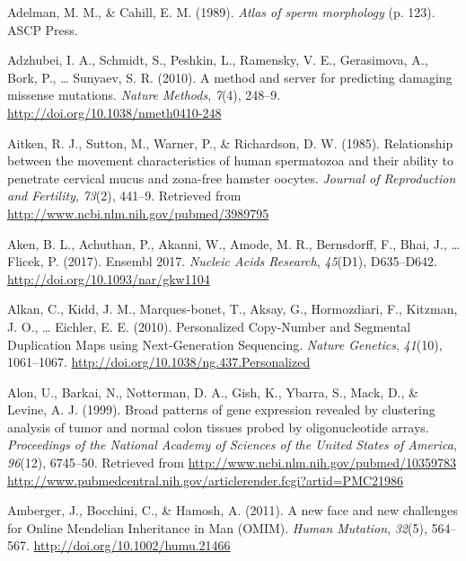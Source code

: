 \documentclass[12pt,twoside]{reedthesis}
\theoremstyle{definition}
\theoremstyle{definition}
\theoremstyle{remark}
\begin{document}
  \hypertarget{ref-Adelman1989}{}
  Adelman, M. M., \& Cahill, E. M. (1989). \emph{Atlas of sperm
  morphology} (p. 123). ASCP Press.
  
  \hypertarget{ref-Adzhubei2010}{}
  Adzhubei, I. A., Schmidt, S., Peshkin, L., Ramensky, V. E., Gerasimova,
  A., Bork, P., \ldots{} Sunyaev, S. R. (2010). A method and server for
  predicting damaging missense mutations. \emph{Nature Methods},
  \emph{7}(4), 248--9. \url{http://doi.org/10.1038/nmeth0410-248}
  
  \hypertarget{ref-Aitken1985}{}
  Aitken, R. J., Sutton, M., Warner, P., \& Richardson, D. W. (1985).
  Relationship between the movement characteristics of human spermatozoa
  and their ability to penetrate cervical mucus and zona-free hamster
  oocytes. \emph{Journal of Reproduction and Fertility}, \emph{73}(2),
  441--9. Retrieved from \url{http://www.ncbi.nlm.nih.gov/pubmed/3989795}
  
  \hypertarget{ref-Aken2017}{}
  Aken, B. L., Achuthan, P., Akanni, W., Amode, M. R., Bernsdorff, F.,
  Bhai, J., \ldots{} Flicek, P. (2017). Ensembl 2017. \emph{Nucleic Acids
  Research}, \emph{45}(D1), D635--D642.
  \url{http://doi.org/10.1093/nar/gkw1104}
  
  \hypertarget{ref-Alkan2010}{}
  Alkan, C., Kidd, J. M., Marques-bonet, T., Aksay, G., Hormozdiari, F.,
  Kitzman, J. O., \ldots{} Eichler, E. E. (2010). Personalized Copy-Number
  and Segmental Duplication Maps using Next-Generation Sequencing.
  \emph{Nature Genetics}, \emph{41}(10), 1061--1067.
  \url{http://doi.org/10.1038/ng.437.Personalized}
  
  \hypertarget{ref-Alon1999}{}
  Alon, U., Barkai, N., Notterman, D. A., Gish, K., Ybarra, S., Mack, D.,
  \& Levine, A. J. (1999). Broad patterns of gene expression revealed by
  clustering analysis of tumor and normal colon tissues probed by
  oligonucleotide arrays. \emph{Proceedings of the National Academy of
  Sciences of the United States of America}, \emph{96}(12), 6745--50.
  Retrieved from
  \href{http://www.ncbi.nlm.nih.gov/pubmed/10359783\%20http://www.pubmedcentral.nih.gov/articlerender.fcgi?artid=PMC21986}{http://www.ncbi.nlm.nih.gov/pubmed/10359783 http://www.pubmedcentral.nih.gov/articlerender.fcgi?artid=PMC21986}
  
  \hypertarget{ref-Amberger2011}{}
  Amberger, J., Bocchini, C., \& Hamosh, A. (2011). A new face and new
  challenges for Online Mendelian Inheritance in Man (OMIM). \emph{Human
  Mutation}, \emph{32}(5), 564--567.
  \url{http://doi.org/10.1002/humu.21466}
  
\end{document}
